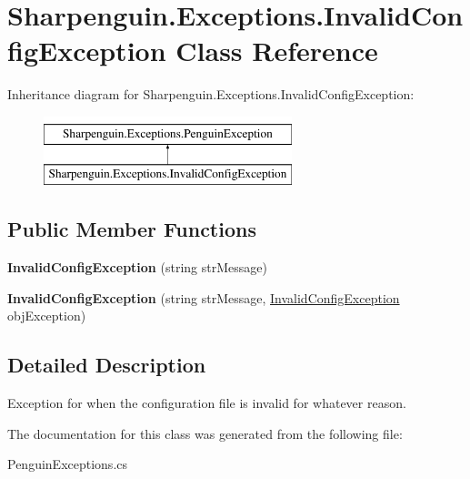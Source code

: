 \hypertarget{classSharpenguin_1_1Exceptions_1_1InvalidConfigException}{\section{Sharpenguin.\-Exceptions.\-Invalid\-Config\-Exception Class Reference}
\label{classSharpenguin_1_1Exceptions_1_1InvalidConfigException}
}
Inheritance diagram for Sharpenguin.\-Exceptions.\-Invalid\-Config\-Exception\-:\begin{figure}[H]
\begin{center}
\leavevmode
\includegraphics[height=2.000000cm]{classSharpenguin_1_1Exceptions_1_1InvalidConfigException}
\end{center}
\end{figure}
\subsection*{Public Member Functions}
\begin{DoxyCompactItemize}
\item 
\hypertarget{classSharpenguin_1_1Exceptions_1_1InvalidConfigException_a0c85ec92c0d3aac12be69f8cefdfed1d}{{\bfseries Invalid\-Config\-Exception} (string str\-Message)}\label{classSharpenguin_1_1Exceptions_1_1InvalidConfigException_a0c85ec92c0d3aac12be69f8cefdfed1d}

\item 
\hypertarget{classSharpenguin_1_1Exceptions_1_1InvalidConfigException_a74d53bab31ab1634694271b07745c83c}{{\bfseries Invalid\-Config\-Exception} (string str\-Message, \hyperlink{classSharpenguin_1_1Exceptions_1_1InvalidConfigException}{Invalid\-Config\-Exception} obj\-Exception)}\label{classSharpenguin_1_1Exceptions_1_1InvalidConfigException_a74d53bab31ab1634694271b07745c83c}

\end{DoxyCompactItemize}


\subsection{Detailed Description}
Exception for when the configuration file is invalid for whatever reason. 

The documentation for this class was generated from the following file\-:\begin{DoxyCompactItemize}
\item 
Penguin\-Exceptions.\-cs\end{DoxyCompactItemize}

